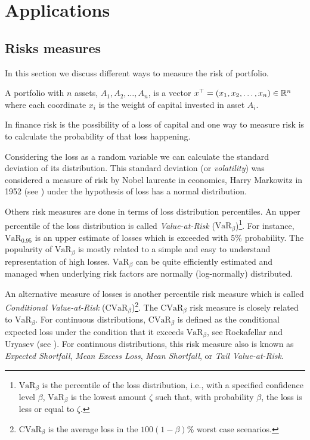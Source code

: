 \chapter{Applications} \label{chap:App}

\section{Risks measures}

In this section we discuss different ways to measure the risk of portfolio.
\begin{definition}
	A portfolio with $n$ assets, $A_1, A_2, \dots, A_n$, is a vector $x^\top = (x_1, x_2, \dots, x_n)\in \mathbb{R}^n$ where each coordinate $x_i$ is the weight of capital invested in asset $A_i$.
\end{definition}
In finance risk is the possibility of a loss of capital and one way to measure risk is to calculate the probability of that loss happening.

Considering the loss as a random variable we can calculate the standard deviation of its distribution. This standard deviation (or \textit{volatility}) was considered a measure of risk by Nobel laureate in economics, Harry Markowitz in 1952 (see \cite{Markowitz1952}) under the hypothesis of loss has a normal distribution.

Others risk measures are done in terms of loss distribution percentiles. An upper percentile of the loss distribution is called \textit{Value-at-Risk} ($\mbox{VaR}_\beta$)\footnote{$\mbox{VaR}_\beta$ is the percentile of the loss distribution, i.e., with a specified confidence level $\beta$,  $\mbox{VaR}_\beta$ is the lowest amount $\zeta$ such that, with probability $\beta$, the loss is less or equal to $\zeta$.}. For instance, $\mbox{VaR}_{0.95}$ is an upper estimate of losses which is exceeded with 5\% probability. The popularity of $\mbox{VaR}_\beta$ is mostly related to a simple and easy to understand representation of high losses. $\mbox{VaR}_\beta$ can be quite efficiently estimated and managed when underlying risk factors are normally (log-normally) distributed.

An alternative measure of losses is another percentile risk measure which is called \textit{Conditional Value-at-Risk} ($\mbox{CVaR}_\beta$)\footnote{$\mbox{CVaR}_\beta$ is the average loss in the $100(1-\beta)$\% worst case scenarios.}. The $\mbox{CVaR}_\beta$ risk measure is closely related to $\mbox{VaR}_\beta$. For continuous distributions, $\mbox{CVaR}_\beta$ is defined as the conditional expected loss under the condition that it exceeds $\mbox{VaR}_\beta$, see Rockafellar and Uryasev (see \cite{RockafellarUryasev2001}). For continuous distributions, this risk measure also is known as \emph{Expected Shortfall}, \textit{Mean Excess Loss}, \textit{Mean Shortfall}, or \textit{Tail Value-at-Risk}.


